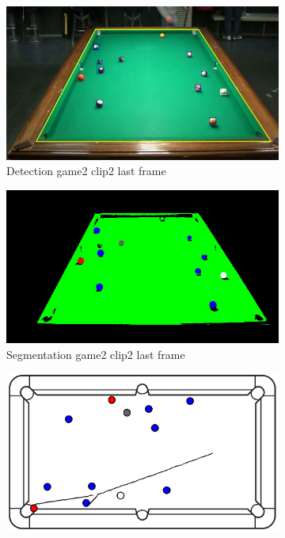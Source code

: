 \begin{figure}[H]
\begin{subfigure}[b]{0.48\textwidth}
        \centering
        \includegraphics[width=\textwidth]{images/Detection/game2_clip2_detected_balls_last_frame.jpg}
        \caption{Detection game2 clip2 last frame}
        \label{fig: game2_clip2_last_frame_detected}
    \end{subfigure}
    \begin{subfigure}[b]{0.48\textwidth}
        \centering
        \includegraphics[width=\textwidth]{images/Segmentation/game2_clip2_segmented_balls_last_frame.jpg}
        \caption{Segmentation game2 clip2 last frame}
		\label{fig: game2_clip2_last_frame_segmented}
    \end{subfigure}
    \begin{subfigure}[b]{0.48\textwidth}
    	\centering
    	\includegraphics[width=\textwidth]{images/AllMinimap/game2_clip2_minimap.png}

\end{subfigure}
\end{figure}
